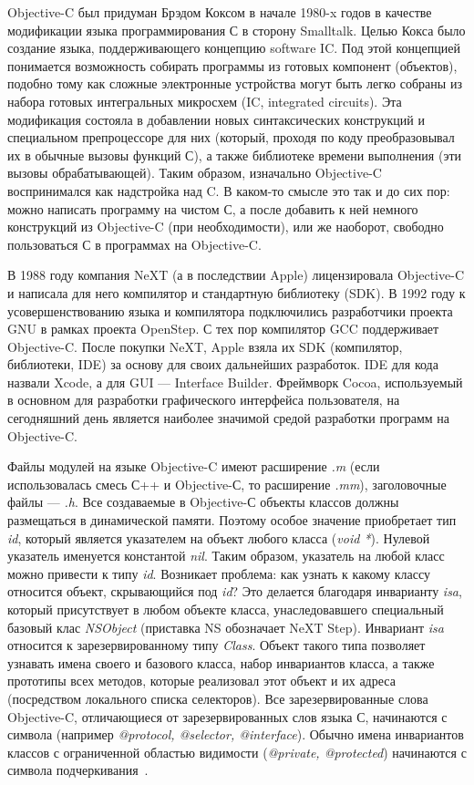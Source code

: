 Objective-C был придуман Брэдом Коксом в начале 1980-x годов
в качестве модификации языка программирования С в сторону Smalltalk.
Целью Кокса было создание языка, поддерживающего концепцию software IC.
Под этой концепцией понимается возможность собирать программы из готовых
компонент (объектов), подобно тому как сложные электронные устройства могут быть
легко собраны из набора готовых интегральных микросхем (IC, integrated circuits).
Эта модификация состояла в добавлении новых синтаксических
конструкций и специальном препроцессоре для них (который, проходя по коду
преобразовывал их в обычные вызовы функций С),
а также библиотеке времени выполнения (эти вызовы обрабатывающей).
Таким образом, изначально Objective-C воспринимался как надстройка над C.
В каком-то смысле это так и до сих пор: можно написать программу на чистом С,
а после добавить к ней немного конструкций из Objective-C (при необходимости),
или же наоборот, свободно пользоваться С в программах на Objective-C.

В 1988 году компания NeXT (а в последствии Apple)
лицензировала Objective-C и написала для него компилятор и
стандартную библиотеку (SDK).
В 1992 году к усовершенствованию языка и компилятора подключились разработчики
проекта GNU в рамках проекта OpenStep. С тех пор компилятор GCC поддерживает Objective-C.
После покупки NeXT, Apple взяла их SDK (компилятор, библиотеки, IDE) за основу
для своих дальнейших разработок. IDE для кода назвали Xcode,
а для GUI --- Interface Builder.
Фреймворк Cocoa, используемый в основном для разработки графического интерфейса пользователя,
на сегодняшний день является наиболее значимой средой разработки программ на Objective-C.

Файлы модулей на языке Objective-C имеют расширение \textit{.m}
(если использовалась смесь С++ и Objective-С, то расширение \textit{.mm}),
заголовочные файлы --- \textit{.h}. Все создаваемые в Objective-С объекты классов
должны размещаться в динамической памяти. Поэтому особое значение приобретает
тип \textit{id}, который является указателем на объект любого класса (\textit{void *}).
Нулевой указатель именуется константой \textit{nil}.
Таким образом, указатель на любой класс можно привести к типу \textit{id}.
Возникает проблема: как узнать к какому классу относится объект,
скрывающийся под \textit{id}? Это делается благодаря инварианту \textit{isa},
который присутствует в любом объекте класса, унаследовавшего специальный
базовый клас \textit{NSObject} (приставка NS обозначает NeXT Step).
Инвариант \textit{isa} относится к зарезервированному типу \textit{Class}.
Объект такого типа позволяет узнавать имена своего и базового класса,
набор инвариантов класса, а также прототипы всех методов,
которые реализовал этот объект и их адреса (посредством локального списка селекторов).
Все зарезервированные слова Objective-C, отличающиеся от зарезервированных
слов языка С, начинаются с символа \@ (например \textit{@protocol, @selector, @interface}).
Обычно имена инвариантов классов с ограниченной
областью видимости (\textit{@private, @protected}) начинаются с
символа подчеркивания~\cite{objective_c_from_scratch, appledoc_ios}.


